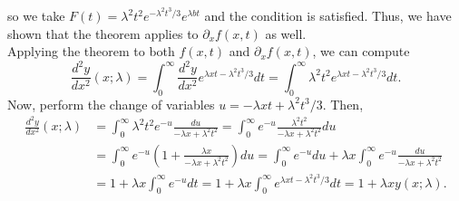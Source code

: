\documentclass{article}
\begin{document}
so we take $F(t)=\lambda^2 t^2e^{- \lambda ^2 t^3/3}e^{\lambda b t}$ and the condition is satisfied. Thus, we have shown that the theorem applies to $\partial_x f(x,t)$ as well. \\
Applying the theorem to both $f(x,t)$ and $\partial_x f(x,t)$, we can compute 
\[
\frac{d^2 y}{d x^2} (x;\lambda) = \int_0^\infty \frac{d^2 y}{d x^2}e^{\lambda x t - \lambda ^2 t^3/3} d t=\int_0^\infty \lambda^2 t^2e^{\lambda x t - \lambda ^2 t^3/3} d t.
\]
Now, perform the change of variables $u=-\lambda x t + \lambda ^2 t^3/3$. Then,
\begin{align*}
\frac{d^2 y}{d x^2} (x;\lambda) &=\int_0^\infty \lambda^2 t^2 e^{-u}\frac{du}{-\lambda x+\lambda^2t^2}=\int_0^\infty  e^{-u}\frac{\lambda^2 t^2}{-\lambda x+\lambda^2t^2}du\\&=
\int_0^\infty  e^{-u}\left(1+\frac{\lambda x}{-\lambda x+\lambda^2t^2}\right)du=\int_0^\infty e^{-u} du+\lambda x\int_0^\infty e^{-u} \frac{du}{-\lambda x+\lambda^2t^2}\\&=
1+\lambda x \int_0^\infty e^{-u} dt=1+\lambda x\int_0^\infty e^{\lambda x t - \lambda ^2 t^3/3}dt=1 + \lambda x y(x;\lambda).
\end{align*}
\end{document}
